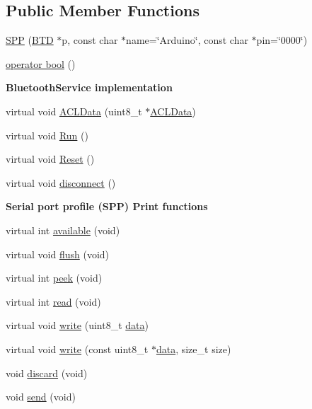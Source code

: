 \subsection*{\-Public \-Member \-Functions}
\begin{DoxyCompactItemize}
\item 
\hyperlink{class_s_p_p_a6842e2b7f66024eecc151e3bdbfc7e94}{\-S\-P\-P} (\hyperlink{class_b_t_d}{\-B\-T\-D} $\ast$p, const char $\ast$name=\char`\"{}\-Arduino\char`\"{}, const char $\ast$pin=\char`\"{}0000\char`\"{})
\item 
\hyperlink{class_s_p_p_ac90f0765c478bd624cee3b8d493d8432}{operator bool} ()
\end{DoxyCompactItemize}
\begin{Indent}{\bf \-Bluetooth\-Service implementation}\par
\begin{DoxyCompactItemize}
\item 
virtual void \hyperlink{class_s_p_p_abdfe9453fb82781bec53a191c2e9fb1d}{\-A\-C\-L\-Data} (uint8\-\_\-t $\ast$\hyperlink{class_s_p_p_abdfe9453fb82781bec53a191c2e9fb1d}{\-A\-C\-L\-Data})
\item 
virtual void \hyperlink{class_s_p_p_a2de67ee7ad1be9d2f3daf7dc08dc5f90}{\-Run} ()
\item 
virtual void \hyperlink{class_s_p_p_ae2c661bd46cd2d74bd29c4c771cd2ef0}{\-Reset} ()
\item 
virtual void \hyperlink{class_s_p_p_a2b4b1f85f553c6a2fdd523e50c75c7b0}{disconnect} ()
\end{DoxyCompactItemize}
\end{Indent}
\begin{Indent}{\bf \-Serial port profile (\-S\-P\-P) \-Print functions}\par
\begin{DoxyCompactItemize}
\item 
virtual int \hyperlink{class_s_p_p_a731eb43856854b6a406e9cfa3f9e57a4}{available} (void)
\item 
virtual void \hyperlink{class_s_p_p_a81c4ed9671652c96df96444a61f64194}{flush} (void)
\item 
virtual int \hyperlink{class_s_p_p_a3149d75ba4646ba5b5428c465e983144}{peek} (void)
\item 
virtual int \hyperlink{class_s_p_p_aae8dc037e845480f582afea57b858b95}{read} (void)
\item 
virtual void \hyperlink{class_s_p_p_ad62d3a4c2c7783c8bf6f2ac62296b5bb}{write} (uint8\-\_\-t \hyperlink{masstorage_8h_afb87d045bbf32b236fc425efe02bdc7b}{data})
\item 
virtual void \hyperlink{class_s_p_p_a5b1f009ca7f8d6ed33cb2fb6255dc858}{write} (const uint8\-\_\-t $\ast$\hyperlink{masstorage_8h_afb87d045bbf32b236fc425efe02bdc7b}{data}, size\-\_\-t size)
\item 
void \hyperlink{class_s_p_p_a4ca8c34757efb43a449cf8b3c7672e23}{discard} (void)
\item 
void \hyperlink{class_s_p_p_ab6c20e303965056403ae5aef1d228858}{send} (void)
\end{DoxyCompactItemize}
\end{Indent}
